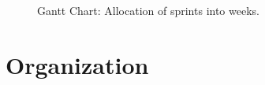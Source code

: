 \documentclass{article}
\begin{document}
\begin{figure}
\begin{center}
\caption{Gantt Chart: Allocation of sprints into weeks.}
\begin{sideways}
\begin{gantt}{8}{14}
    \begin{ganttitle}
    \end{ganttitle}
\end{gantt}
\end{sideways}
\end{center}
\end{figure}

\section{Organization}
\end{document}
